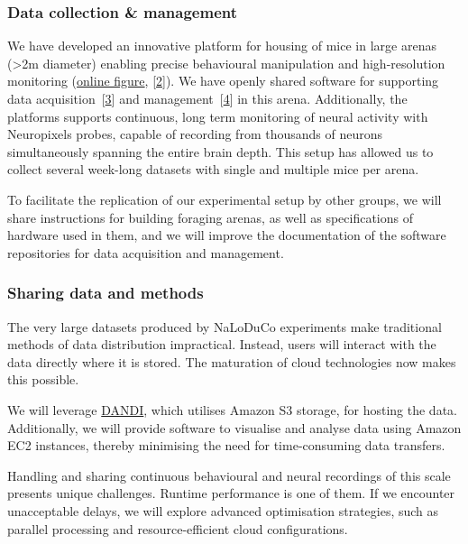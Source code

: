 \subsubsection{Data collection \& management}

We have developed an innovative platform for housing of mice in large arenas
(\textgreater 2m diameter) enabling precise behavioural manipulation and
high-resolution monitoring
(\href{https://www.gatsby.ucl.ac.uk/~rapela/bbsrc\_nsfbio/figures/foragingArena.png}{online
figure},
[\href{https://www.abstractsonline.com/pp8/?_gl=1*it0gi6*_gcl_au*MTUyNDE0NDQwLjE3Mjc2OTgyODM.*_ga*MTUxNDI2NDg5LjE3Mjc2OTgyODM.*_ga_T09K3Q2WDN*MTcyOTUwNDUzNy4yLjEuMTcyOTUwNDY3Ny41NC4wLjA.#!/20433/presentation/22271}{2}]).
%
We have openly shared software for supporting data
acquisition~[\href{https://github.com/SainsburyWellcomeCentre/aeon_acquisition}{3}]
and
management~[\href{https://github.com/SainsburyWellcomeCentre/aeon_mecha}{4}] in this
arena.
%
Additionally, the platforms supports continuous, long term monitoring of neural
activity with Neuropixels probes, capable of recording from thousands of
neurons simultaneously spanning the entire brain depth.
%
This setup has allowed us to collect several week-long datasets with single and
multiple mice per arena.

To facilitate the replication of our experimental setup by other groups, we
will share instructions for building foraging arenas, as well as specifications
of hardware used in them,
%
and we will improve the documentation of the software repositories for data
acquisition and management.

\subsubsection{Sharing data and methods}

The very large datasets produced by NaLoDuCo experiments make traditional
methods of data distribution impractical. Instead, users will interact with the
data directly where it is stored. The maturation of cloud technologies now
makes this possible.

We will leverage \href{https://www.dandiarchive.org/}{DANDI}, which utilises
Amazon S3 storage, for hosting the data. Additionally, we will provide software
to visualise and analyse data using Amazon EC2 instances, thereby minimising
the need for time-consuming data transfers.

Handling and sharing continuous behavioural and neural recordings of this scale
presents unique challenges. Runtime performance is one of them. If we
encounter unacceptable delays, we will explore advanced optimisation
strategies, such as parallel processing and resource-efficient cloud
configurations.


